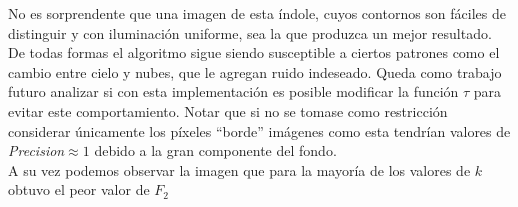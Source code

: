 \vspace{-7mm} 
No es sorprendente que una imagen de esta índole, cuyos contornos son fáciles de distinguir y con iluminaci\'on uniforme, sea la que produzca un mejor resultado. De todas formas el algoritmo sigue siendo susceptible a ciertos patrones como el cambio entre cielo y nubes, que le agregan ruido indeseado. Queda como trabajo futuro analizar si con esta implementaci\'on es posible modificar la funci\'on $\tau$ para evitar este comportamiento. Notar que si no se tomase como restricci\'on considerar \'unicamente los píxeles ``borde'' im\'agenes como esta tendr\'ian valores de \textit{Precision}$\approx 1$ debido a la gran componente del fondo. \\
\indent A su vez podemos observar la imagen que para la mayor\'ia de los valores de $k$ obtuvo el peor valor de $F_2$
\begin{figure}[H]
	\begin{center}
	\hspace{3mm}
	\hspace{3mm}
	\caption{}
	\end{center}
	\label{Fscores}
\end{figure}
\vspace{-7mm} 

